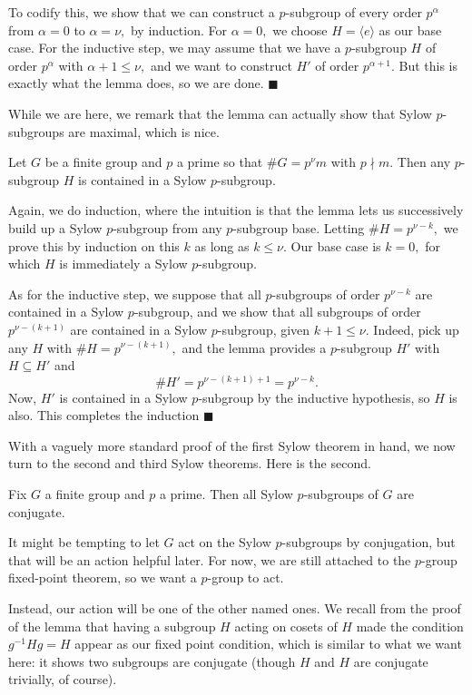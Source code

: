 To codify this, we show that we can construct a $p$-subgroup of every order $p^\alpha$ from $\alpha=0$ to $\alpha=\nu,$ by induction. For $\alpha=0,$ we choose $H=\langle e\rangle$ as our base case. For the inductive step, we may assume that we have a $p$-subgroup $H$ of order $p^\alpha$ with $\alpha+1\le\nu,$ and we want to construct $H'$ of order $p^{\alpha+1}.$ But this is exactly what the lemma does, so we are done. $\blacksquare$

While we are here, we remark that the lemma can actually show that Sylow $p$-subgroups are maximal, which is nice.
\begin{proposition}
    Let $G$ be a finite group and $p$ a prime so that $\#G=p^\nu m$ with $p\nmid m.$ Then any $p$-subgroup $H$ is contained in a Sylow $p$-subgroup.
\end{proposition}
Again, we do induction, where the intuition is that the lemma lets us successively build up a Sylow $p$-subgroup from any $p$-subgroup base. Letting $\#H=p^{\nu-k},$ we prove this by induction on this $k$ as long as $k\le\nu.$ Our base case is $k=0,$ for which $H$ is immediately a Sylow $p$-subgroup.

As for the inductive step, we suppose that all $p$-subgroups of order $p^{\nu-k}$ are contained in a Sylow $p$-subgroup, and we show that all subgroups of order $p^{\nu-(k+1)}$ are contained in a Sylow $p$-subgroup, given $k+1\le\nu.$ Indeed, pick up any $H$ with $\#H=p^{\nu-(k+1)},$ and the lemma provides a $p$-subgroup $H'$ with $H\subseteq H'$ and
\[\#H'=p^{\nu-(k+1)+1}=p^{\nu-k}.\]
Now, $H'$ is contained in a Sylow $p$-subgroup by the inductive hypothesis, so $H$ is also. This completes the induction $\blacksquare$

With a vaguely more standard proof of the first Sylow theorem in hand, we now turn to the second and third Sylow theorems. Here is the second.
\begin{theorem}
    Fix $G$ a finite group and $p$ a prime. Then all Sylow $p$-subgroups of $G$ are conjugate.
\end{theorem}
It might be tempting to let $G$ act on the Sylow $p$-subgroups by conjugation, but that will be an action helpful later. For now, we are still attached to the $p$-group fixed-point theorem, so we want a $p$-group to act.

Instead, our action will be one of the other named ones. We recall from the proof of the lemma that having a subgroup $H$ acting on cosets of $H$ made the condition $g^{-1}Hg=H$ appear as our fixed point condition, which is similar to what we want here: it shows two subgroups are conjugate (though $H$ and $H$ are conjugate trivially, of course).

